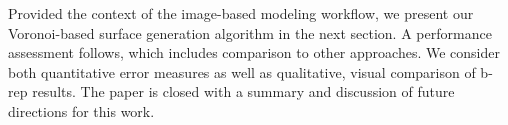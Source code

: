 Provided the context of the image-based modeling workflow, we present our Voronoi-based surface generation algorithm in the next section. A performance assessment follows, which includes comparison to other approaches.  We consider both quantitative error measures as well as qualitative, visual comparison of b-rep results.  The paper is closed with a summary and discussion of future directions for this work.